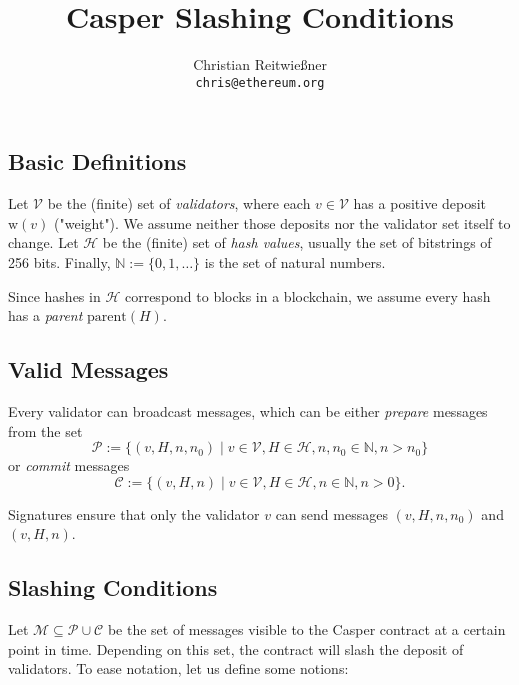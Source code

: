 \documentclass[11pt,letterpaper]{article}
\date{}
\newcommand{\uint}{\mathbb{N}}
\newcommand{\eqdef}{:=}
\newcommand{\validators}{\mathcal{V}}
\newcommand{\messages}{\mathcal{M}}
\begin{document}


\title{Casper Slashing Conditions}

\author{Christian Reitwießner \\
{\tt chris@ethereum.org}}


\maketitle

\subsection{Basic Definitions}

Let $\validators$ be the (finite) set of \emph{validators}, where each
$v \in \validators$ has a positive deposit $\mathrm{w}(v)$ ("weight"). We assume neither those
deposits nor the validator set itself to change.
Let $\mathcal{H}$ be the (finite) set of \emph{hash values}, usually
the set of bitstrings of 256 bits. Finally, $\uint \eqdef \{0, 1, \dots\}$
is the set of natural numbers.

Since hashes in $\mathcal{H}$ correspond to blocks in a blockchain, we assume every hash
has a \emph{parent} $\mathrm{parent}(H)$.

\subsection*{Valid Messages}

Every validator can broadcast messages, which can be either \emph{prepare} messages from
the set
\[
  \mathcal{P} \eqdef \{(v, H, n, n_0) \mid
  v \in \validators, H \in \mathcal{H}, n,n_0 \in \uint,
  n > n_0
  \}
\]
or \emph{commit} messages
\[
  \mathcal{C} \eqdef \{(v, H, n) \mid
  v \in \validators, H \in \mathcal{H}, n \in \uint, n > 0\}.
\]

Signatures ensure that only the validator $v$ can send messages $(v, H, n, n_0)$
and $(v, H, n)$.

\subsection*{Slashing Conditions}

Let $\messages \subseteq \mathcal{P} \cup \mathcal{C}$ be the set of messages
visible to the Casper contract at a certain point in time. Depending on
this set, the contract will slash the deposit of validators. To ease notation,
let us define some notions:
\end{document}
